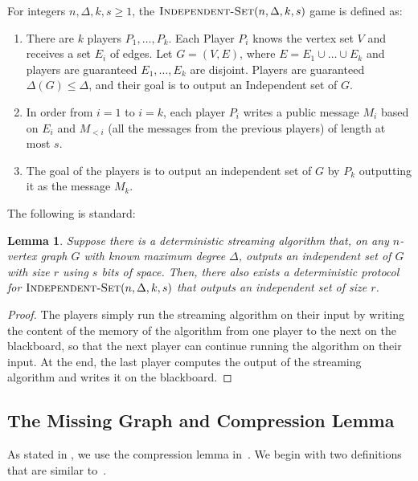 \documentclass[11pt]{article}
\newtheorem{lemma}{Lemma}[section]
\theoremstyle{definition}
\renewcommand{\leq}{\leqslant}
\renewcommand{\geq}{\geqslant}
\renewcommand{\le}{\leq}
\renewcommand{\ge}{\geq}
\begin{document}
\newcommand{\IndepSet}{\textnormal{\textsc{Independent-Set}}}

\begin{mdframed}
    For integers $n, \Delta, k, s\ge 1$, the $\IndepSet(n, \Delta, k, s)$ game is defined as:
    \begin{enumerate}
        \item There are $k$ players $P_1, \dots, P_k$. Each Player $P_i$ knows the vertex set $V$ and receives a set $E_i$ of edges. Let $G=(V, E)$, where $E=E_1\cup \dots\cup E_k$ and players are guaranteed $E_1,\dots, E_k$ are disjoint. Players are guaranteed $\Delta(G)\le \Delta$, and their goal is to output an Independent set of $G$.
        \item In order from $i=1$ to $i=k$, each player $P_i$ writes a public message $M_i$ based on $E_i$ and $M_{<i}$ (all the messages from the previous players) of length at most $s$. 
        \item The goal of the players is to output an independent set of $G$ by $P_k$ outputting it as the message $M_k$. 
    \end{enumerate}
\end{mdframed}

The following is standard:

\begin{lemma}\label{algo-to-players}
    Suppose there is a deterministic streaming algorithm that, on any $n$-vertex graph $G$ with known maximum degree $\Delta$, outputs an independent set of $G$ with size $r$ using $s$ bits of space. Then, there also exists a deterministic protocol for $\IndepSet(n,\Delta, k, s)$ that outputs an independent set of size $r$.
\end{lemma}
\begin{proof}
The players simply run the streaming algorithm on their input by writing the content of the memory of the algorithm from one player to the next on the blackboard, so that the next player can continue running the algorithm on their input. At the end, the last player computes the output of the streaming algorithm and writes it on the blackboard.
\end{proof}

\subsection{The Missing Graph and Compression Lemma}

As stated in , we use the compression lemma in~\cite{assadi2022deterministic}. We begin with two definitions that are similar to~\cite{assadi2022deterministic}.
\end{document}
